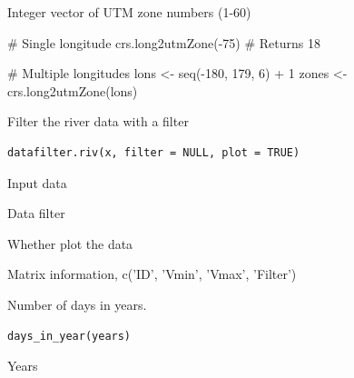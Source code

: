 \documentclass[a4paper]{book}
\begin{document}
%
\begin{Value}
Integer vector of UTM zone numbers (1-60)
\end{Value}
%
\begin{Examples}
\begin{ExampleCode}
# Single longitude
crs.long2utmZone(-75)  # Returns 18

# Multiple longitudes
lons <- seq(-180, 179, 6) + 1
zones <- crs.long2utmZone(lons)
\end{ExampleCode}
\end{Examples}
%
\begin{Description}\relax
Filter the river data with a filter
\end{Description}
%
\begin{Usage}
\begin{verbatim}
datafilter.riv(x, filter = NULL, plot = TRUE)
\end{verbatim}
\end{Usage}
%
\begin{Arguments}
\begin{ldescription}
\item[\code{x}] Input data

\item[\code{filter}] Data filter

\item[\code{plot}] Whether plot the data
\end{ldescription}
\end{Arguments}
%
\begin{Value}
Matrix information, c('ID', 'Vmin', 'Vmax', 'Filter')
\end{Value}
%
\begin{Description}\relax
Number of days in years.
\end{Description}
%
\begin{Usage}
\begin{verbatim}
days_in_year(years)
\end{verbatim}
\end{Usage}
%
\begin{Arguments}
\begin{ldescription}
\item[\code{years}] Years
\end{ldescription}
\end{Arguments}
\end{document}

